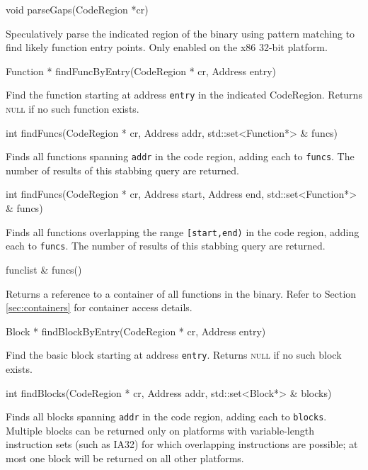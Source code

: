 \documentclass{article}
\newenvironment{apient}{\small\verbatim}{\endverbatim}
\newcommand{\apidesc}[1]{%
{\addtolength{\leftskip}{4em}%
#1\par\medskip}
}
\begin{document}
\begin{apient}
void parseGaps(CodeRegion *cr)
\end{apient}
\apidesc{Speculatively parse the indicated region of the binary using pattern matching to find likely function entry points. Only enabled on the x86 32-bit platform.}

\begin{apient}
Function * findFuncByEntry(CodeRegion * cr, Address entry)
\end{apient}
\apidesc{Find the function starting at address \texttt{entry} in the indicated CodeRegion. Returns {\scshape null} if no such function exists.}

\begin{apient}
int findFuncs(CodeRegion * cr, Address addr, std::set<Function*> & funcs)
\end{apient}
\apidesc{Finds all functions spanning \texttt{addr} in the code region, adding each to \texttt{funcs}. The number of results of this stabbing query are returned.}

\begin{apient}
int findFuncs(CodeRegion * cr, Address start, Address end, std::set<Function*> & funcs)
\end{apient}
\apidesc{Finds all functions overlapping the range \texttt{[start,end)} in the code region, adding each to \texttt{funcs}. The number of results of this stabbing query are returned.}

\begin{apient}
funclist & funcs()
\end{apient}
\apidesc{Returns a reference to a container of all functions in the binary. Refer to Section \ref{sec:containers} for container access details.}

\begin{apient}
Block * findBlockByEntry(CodeRegion * cr, Address entry)
\end{apient}
\apidesc{Find the basic block starting at address \texttt{entry}. Returns {\scshape null} if no such block exists.}

\begin{apient}
int findBlocks(CodeRegion * cr, Address addr, std::set<Block*> & blocks)
\end{apient}
\apidesc{Finds all blocks spanning \texttt{addr} in the code region, adding each to \texttt{blocks}. Multiple blocks can be returned only on platforms with variable-length instruction sets (such as IA32) for which overlapping instructions are possible; at most one block will be returned on all other platforms.}
\end{document}
